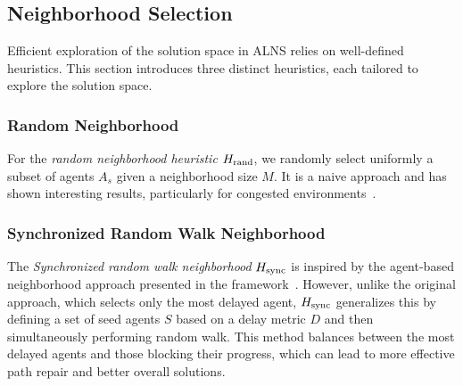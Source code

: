 \documentclass[review]{jair}
\begin{document}
\subsection{Neighborhood Selection}
Efficient exploration of the solution space in ALNS relies on well-defined heuristics. This section introduces three distinct heuristics, each tailored to explore the solution space. 

\subsubsection{Random Neighborhood}
For the \emph{random neighborhood heuristic} $H_{\textnormal{rand}}$, we randomly select uniformly a subset of agents \(A_s\) given a neighborhood size \(M\). It is a naive approach and has shown interesting results, particularly for congested environments~\citep{Emrah, LNS, Song, LNS2}.

\subsubsection{Synchronized Random Walk Neighborhood} 
The \emph{Synchronized random walk neighborhood} $H_{\textnormal{sync}}$ is inspired by the agent-based neighborhood approach presented in the  framework~\citep{LNS}. However, unlike the original approach, which selects only the most delayed agent, $H_{\textnormal{sync}}$ generalizes this by defining a set of seed agents \( S \) based on a delay metric \( D \) and then simultaneously performing random walk. This method balances between the most delayed agents and those blocking their progress, which can lead to more effective path repair and better overall solutions. 
\end{document}
